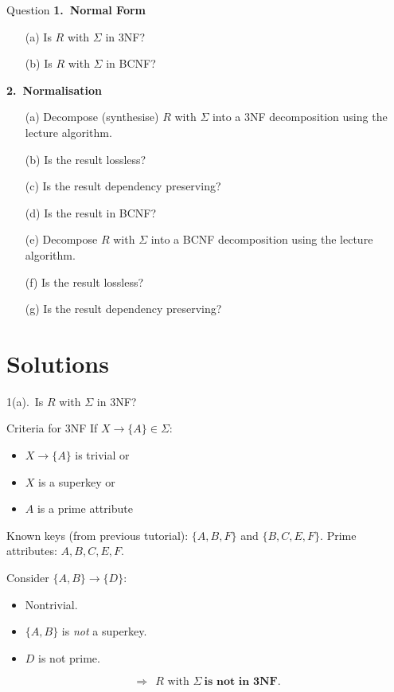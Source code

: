 \documentclass[UTF8]{beamer}
\begin{document}
\begin{frame}{Question}
\footnotesize
\textbf{1.\ Normal Form}
\begin{itemize}
  \item[(a)] Is $R$ with $\Sigma$ in 3NF?
  \item[(b)] Is $R$ with $\Sigma$ in BCNF?
\end{itemize}
\textbf{2.\ Normalisation}
\begin{itemize}
  \item[(a)] Decompose (synthesise) $R$ with $\Sigma$ into a 3NF decomposition using the lecture algorithm.
  \item[(b)] Is the result lossless?
  \item[(c)] Is the result dependency preserving?
  \item[(d)] Is the result in BCNF?
  \item[(e)] Decompose $R$ with $\Sigma$ into a BCNF decomposition using the lecture algorithm.
  \item[(f)] Is the result lossless?
  \item[(g)] Is the result dependency preserving?
\end{itemize}
\end{frame}

\section{Solutions}

\begin{frame}{1(a).\ Is $R$ with $\Sigma$ in 3NF?}
\footnotesize
\begin{block}{Criteria for 3NF}
    If $X\to \{A\} \in \Sigma$:
    \begin{itemize}
        \item $X\to \{A\}$ is trivial \alert{or}
        \item $X$ is a superkey \alert{or}
        \item $A$ is a prime attribute
    \end{itemize}
\end{block}
Known keys (from previous tutorial): $\{A,B,F\}$ and $\{B,C,E,F\}$.
Prime attributes: $A,B,C,E,F$.\medskip

Consider $\{A,B\}\to\{D\}$:
\begin{itemize}\itemsep2pt
  \item Nontrivial.
  \item $\{A,B\}$ is \emph{not} a superkey.
  \item $D$ is not prime.
\end{itemize}
\[
\Rightarrow\ \ R\text{ with }\Sigma\ \textbf{is not in 3NF.}
\]
\end{frame}
\end{document}
